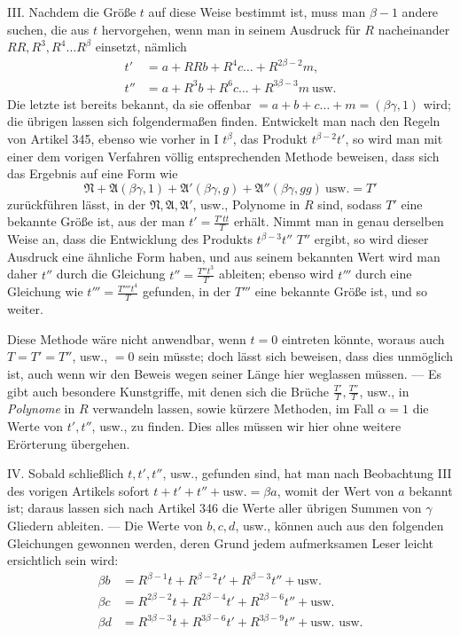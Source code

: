 III. Nachdem die Größe \(t\) auf diese Weise bestimmt ist, muss man \(\beta-1\) andere suchen, die aus \(t\) hervorgehen, wenn man in seinem Ausdruck für \(R\) nacheinander \(RR,\allowbreak R^3,\allowbreak R^4\ldots R^\beta\) einsetzt, nämlich \[\begin{aligned}t'&=a+RRb+R^4c\ldots+R^{2\beta-2}m,\\t''&=a+R^3b+R^6c\ldots+R^{3\beta-3}m\ \text{usw.}\end{aligned}\] Die letzte ist bereits bekannt, da sie offenbar \(=a+b+c\ldots+m=(\beta\gamma,1)\) wird; die übrigen lassen sich folgendermaßen finden. Entwickelt man nach den Regeln von Artikel 345, ebenso wie vorher in I \(t^\beta\), das Produkt \(t^{\beta-2}t'\), so wird man mit einer dem vorigen Verfahren völlig entsprechenden Methode beweisen, dass sich das Ergebnis auf eine Form wie
{ \[\mathfrak{N}+\mathfrak{A}(\beta\gamma,1)+\mathfrak{A}'(\beta\gamma,g)+\mathfrak{A}''(\beta\gamma,gg)\ \text{usw.}=T'\]} zurückführen lässt, in der \(\mathfrak{N},\allowbreak \mathfrak{A},\allowbreak \mathfrak{A}'\), usw., Polynome in \(R\) sind, sodass \(T'\) eine bekannte Größe ist, aus der man \(t'=\frac{T'tt}{T}\) erhält. Nimmt man in genau derselben Weise an, dass die Entwicklung des Produkts \(t^{\beta-3}t''\) \(T''\) ergibt, so wird dieser Ausdruck eine ähnliche Form haben, und aus seinem bekannten Wert wird man daher \(t''\) durch die Gleichung \(t''=\frac{T''t^3}{T}\) ableiten; ebenso wird \(t'''\) durch eine Gleichung wie \(t'''=\frac{T''''t^4}{T}\) gefunden, in der \(T'''\) eine bekannte Größe ist, und so weiter.

Diese Methode wäre nicht anwendbar, wenn \(t=0\) eintreten könnte, woraus auch \(T=T'=T''\), usw., \(=0\) sein müsste; doch lässt sich beweisen, dass dies unmöglich ist, auch wenn wir den Beweis wegen seiner Länge hier weglassen müssen. — Es gibt auch besondere Kunstgriffe, mit denen sich die Brüche \(\frac{T'}T,\allowbreak \frac{T''}T\), usw., in \textit{Polynome} in \(R\) verwandeln lassen, sowie kürzere Methoden, im Fall \(\alpha=1\) die Werte von \(t',\allowbreak t''\), usw., zu finden. Dies alles müssen wir hier ohne weitere Erörterung übergehen.

IV. Sobald schließlich \(t,\allowbreak t',\allowbreak t''\), usw., gefunden sind, hat man nach Beobachtung III des vorigen Artikels sofort \(t+t'+t''+\text{usw.}=\beta a\), womit der Wert von \(a\) bekannt ist; daraus lassen sich nach Artikel 346 die Werte aller übrigen Summen von \(\gamma\) Gliedern ableiten. — Die Werte von \(b,\allowbreak c,\allowbreak d\), usw., können auch aus den folgenden Gleichungen gewonnen werden, deren Grund jedem aufmerksamen Leser leicht ersichtlich sein wird: \[\begin{aligned}\beta b&=R^{\beta-1}t+R^{\beta-2}t'+R^{\beta-3}t''+\text{usw.}\\\beta c&=R^{2\beta-2}t+R^{2\beta-4}t'+R^{2\beta-6}t''+\text{usw.}\\\beta d&=R^{3\beta-3}t+R^{3\beta-6}t'+R^{3\beta-9}t''+\text{usw. usw.}\end{aligned}\]

